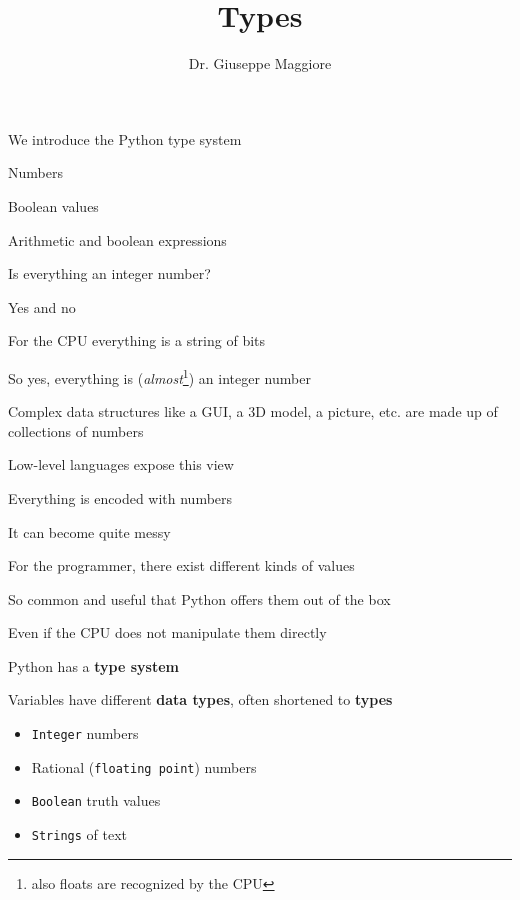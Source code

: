 \documentclass{beamer}
\title{Types}
\author{Dr. Giuseppe Maggiore}
\institute{Hogeschool Rotterdam \\ 
Rotterdam, Netherlands}
\date{}
\begin{document}
\maketitle

\begin{slide}{
\item We introduce the Python type system
\item Numbers
\item Boolean values
\item Arithmetic and boolean expressions
}\end{slide}

\begin{slide}{
\item Is everything an integer number?
\item Yes and no
}\end{slide}

\begin{slide}{
\item For the CPU everything is a string of bits
\item So yes, everything is (\textit{almost}\footnote{also floats are recognized by the CPU}) an integer number
\item Complex data structures like a GUI, a 3D model, a picture, etc. are made up of collections of numbers
}\end{slide}

\begin{slide}{
\item Low-level languages expose this view
\item Everything is encoded with numbers
\item It can become quite messy
}\end{slide}

\begin{slide}{
\item For the programmer, there exist different kinds of values
\item So common and useful that Python offers them out of the box
\item Even if the CPU does not manipulate them directly
}\end{slide}

\begin{slide}{
\item Python has a \textbf{type system}
\item Variables have different \textbf{data types}, often shortened to \textbf{types}
\begin{itemize}
\item \texttt{Integer} numbers
\item Rational (\texttt{floating point}) numbers
\item \texttt{Boolean} truth values
\item \texttt{Strings} of text
\end{itemize}
}\end{slide}
\end{document}
